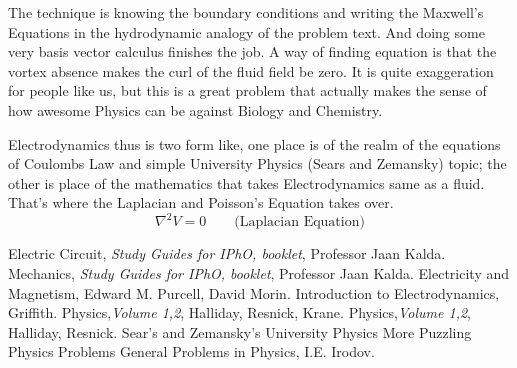 \documentclass[11pt,a4paper,twocolumn,openright]{article}
\theoremstyle{definition}
\theoremstyle{definition}
\theoremstyle{definition}
\theoremstyle{definition}
\begin{document}
The technique is knowing the boundary conditions and writing the Maxwell's Equations in the hydrodynamic analogy of the problem text. And doing some very basis vector calculus finishes the job. A way of finding equation is that the vortex absence makes the curl of the fluid field be zero. It is quite exaggeration for people like us, but this is a great problem that actually makes the sense of how awesome Physics can be against Biology and Chemistry.


	Electrodynamics thus is two form like, one place is of the realm of the equations of Coulombs Law and simple University Physics (Sears and Zemansky) topic; the other is place of the mathematics that takes Electrodynamics same as a fluid. That's where the Laplacian and Poisson's Equation takes over.
	\begin{equation}
	\nabla^2 V = 0 \qquad \text{(Laplacian Equation)}
	\end{equation}
\begin{small}
\begin{thebibliography}{9}

{\sffamily Electric Circuit}, \emph{Study Guides for IPhO, booklet}, Professor Jaan Kalda.
{\sffamily Mechanics}, \emph{Study Guides for IPhO, booklet}, Professor Jaan Kalda.
{\sffamily Electricity and Magnetism}, Edward M. Purcell, David Morin.
{\sffamily Introduction to Electrodynamics}, Griffith.
{\sffamily Physics},\emph{Volume 1,2}, Halliday, Resnick, Krane.
{\sffamily Physics},\emph{Volume 1,2}, Halliday, Resnick.
{\sffamily Sear's and Zemansky's University Physics}
{ More Puzzling Physics Problems}
{\sffamily General Problems in Physics}, I.E. Irodov.

\end{thebibliography}
\end{small}
\
\end{document}
